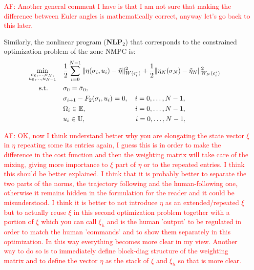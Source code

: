 \textcolor{red}{AF: Another general comment I have is that I am not sure that making the difference between Euler angles is mathematically correct, anyway let's go back to this later.}

Similarly, the nonlinear program (\textbf{NLP$_2$}) that corresponds to the constrained optimization problem of the zone NMPC is:
\begin{equation*}\label{eq:nlp2}
{\!\!\!\!\!}{\!\!}\begin{aligned}
&\underset{\begin{subarray}{c}
\sigma_0, \dots, \sigma_N, \\
u_0, \dots, u_{N-1}
\end{subarray}}{\min}	    &&\frac{1}{2}\sum_{i=0}^{N-1} \|\eta(\sigma_i,u_i)-\Tilde{\eta}\|^2_{W(\epsilon_i^ \star)} + \frac{1}{2}\|\eta_N(\sigma_N)-\Tilde{\eta}_N\|^2_{W_N(\epsilon_i^\star)}\\ 
&\,\,\,\quad \text{s.t.}    &&\sigma_0 = \Bar{\sigma}_0, \\
& 						    &&\sigma_{i+1} - F_2(\sigma_i,u_i) = 0, \,\,\,\,\,\, i = 0,\dots, N-1,\\
& 						    &&\Omega_i\in \mathbb{E}, \,\,\,\,\,\,\,\,\,\,\,\,\,\,\,\,\,\,\,\,\,\,\,\,\,\,\,\,\,\,\,\,\,\,\,\,\,\,\,\,\,\,\, i = 0,\dots, N-1,\\
& 						    &&u_i\in \mathbb{U}, \,\,\,\,\,\,\,\,\,\,\,\,\,\,\,\,\,\,\,\,\,\,\,\,\,\,\,\,\,\,\,\,\,\,\,\,\,\,\,\,\,\,\,\, i = 0,\dots, N-1,
\end{aligned}{\!\!\!}
\end{equation*}

\textcolor{red}{AF: OK, now I think understand better why you are elongating the state vector $\xi$ in $\eta$ repeating some its entries again, I guess this is in order to make the difference in the cost function and then the weighting matrix will take care of the mixing, giving more importance to $\xi$ part of $\eta$ or to the repeated entries. I think this should be better explained. I think that it is probably better to separate the two parts of the norms, the trajectory following and the human-following one, otherwise it remains hidden in the formulation for the reader and it could be misunderstood. I think it is better to not introduce $\eta$ as an extended/repeated $\xi$ but to actually reuse $\xi$ in this second optimization problem together with a portion of $\xi$ which you can call $\xi_h$ and is  the human 'output' to be regulated in order to match the human 'commands' and to show them separately in this optimization. In this way everything becomes more clear in my view. Another way to do so is to immediately define block-diag  structure of the weighting matrix and to define the vector $\eta$ as the stack of $\xi$ and $\xi_h$ so that is more clear.}

